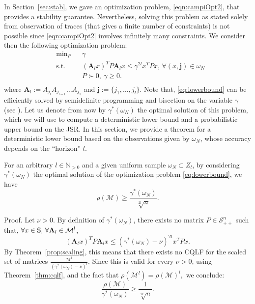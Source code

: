 In Section~\ref{sec:stab}, we gave an optimization problem, \eqref{eqn:campiOpt2}, that provides a stability guarantee. Nevertheless, solving this problem as stated solely from observation of traces (that gives a finite number of constraints) is not possible since \eqref{eqn:campiOpt2} involves infinitely many constraints. We consider then the following optimization problem:
\begin{equation}\label{eq:lowerbound}
\begin{aligned}
& \text{min}_P & & \gamma \\
& \text{s.t.} 
&  & (\mathbf{A}_l x)^T P \mathbf{A}_l x \leq \gamma^{2l} x^T P x, \,  \forall (x, \mathbf{j}) \in \omega_N\\
& && P \succ 0,\ \gamma \geq 0. \\
\end{aligned}
\end{equation}
where $\mathbf{A}_l :=  A_{j_l} A_{j_{l-1}} \dots A_{j_1}$ and $\mathbf{j}:=\{j_1,\dots, j_l\}$. Note that, \eqref{eq:lowerbound} can be efficiently solved by semidefinite programming and bisection on the variable $\gamma$ (see \cite{boyd}). Let us denote from now by $\gamma^*(\omega_N)$ the optimal solution of this problem, which we will use to compute a deterministic lower bound and a probabilistic upper bound on the JSR. In this section, we provide a theorem for a deterministic lower bound based on the observations given by $\omega_N$, whose accuracy depends on the ``horizon'' $l$.
\begin{thm}\label{thm:lowerbound}
For an arbitrary $l \in \mathbb{N}_{>0}$ and a given uniform sample $\omega_N \subset Z_l$, by considering $\gamma^*(\omega_N)$ the optimal solution of the optimization problem \eqref{eq:lowerbound}, we have $$\rho(\mathcal{M}) \geq \frac{\gamma^*(\omega_N)}{\sqrt[2l]{n}}.$$ 
\end{thm}
\vspace{-0.8cm}
\begin{pf*}{Proof.}
Let $\nu >0$. By definition of $\gamma^*(\omega_N)$, there exists no matrix $P \in \mathcal{S}^n_{++}$ such that, $\forall x \in \mathbb{S}, \, \forall \mathbf{A}_l \in \mathcal{M}^{l}$,
\begin{equation*}
(\mathbf{A}_l x)^T P \mathbf{A}_l x \leq (\gamma^*(\omega_N) -\nu)^{2l} x^T P x.
\end{equation*}
By Theorem~\ref{prop:scaling}, this means that there exists no CQLF for the scaled set of matrices $\frac{\mathcal{M}^l}{(\gamma^*(\omega_N)-\nu)^l}$. Since this is valid for every $\nu > 0$, using Theorem~\ref{thm:cqlf}, and the fact that $\rho(\mathcal{M}^l)=\rho(\mathcal{M})^l,$ we conclude:
\begin{equation*}
\frac{\rho(\mathcal{M})}{\gamma^*(\omega_N)} \geq \frac{1}{\sqrt[2l]{n}}.
\end{equation*}
\end{pf*}